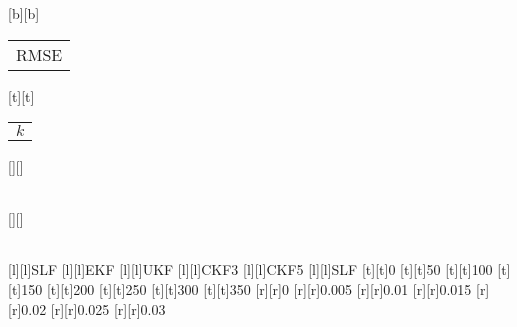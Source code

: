 %
%
[b][b]{\color[rgb]{0,0,0}\setlength{\tabcolsep}{0pt}\begin{tabular}{c}RMSE\end{tabular}}%
[t][t]{\color[rgb]{0,0,0}\setlength{\tabcolsep}{0pt}\begin{tabular}{c}$k$\end{tabular}}%
[][]{\color[rgb]{0,0,0}\setlength{\tabcolsep}{0pt}\begin{tabular}{c} \end{tabular}}%
[][]{\color[rgb]{0,0,0}\setlength{\tabcolsep}{0pt}\begin{tabular}{c} \end{tabular}}%
[l][l]{\color[rgb]{0,0,0}SLF}%
[l][l]{\color[rgb]{0,0,0}EKF}%
[l][l]{\color[rgb]{0,0,0}UKF}%
[l][l]{\color[rgb]{0,0,0}CKF3}%
[l][l]{\color[rgb]{0,0,0}CKF5}%
[l][l]{\color[rgb]{0,0,0}SLF}%
%
[t][t]{0}%
[t][t]{50}%
[t][t]{100}%
[t][t]{150}%
[t][t]{200}%
[t][t]{250}%
[t][t]{300}%
[t][t]{350}%
%
[r][r]{0}%
[r][r]{0.005}%
[r][r]{0.01}%
[r][r]{0.015}%
[r][r]{0.02}%
[r][r]{0.025}%
[r][r]{0.03}%
%
%
